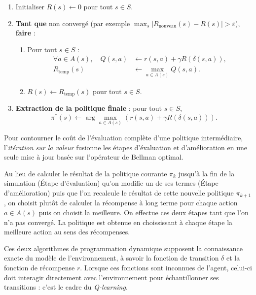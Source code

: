 \begin{algorithm}[H]
    \caption{Itération sur la valeur (\emph{Value Iteration})}
    \begin{enumerate}
        \item Initialiser $R(s) \longleftarrow 0$ pour tout $s \in S$.
        \item \textbf{Tant que} non convergé (par exemple $\max_{s} |R_{\text{nouveau}}(s) - R(s)| > \varepsilon$), \textbf{faire} :
        \begin{enumerate}
            \item Pour tout $s \in S$ :
            \begin{align}
                \forall a \in A(s), \quad Q(s, a) &\longleftarrow r(s, a) + \gamma R(\delta(s, a)), \\
                R_{\text{temp}}(s) &\longleftarrow \max_{a \in A(s)} Q(s, a).
            \end{align}
            \item $R(s) \longleftarrow R_{\text{temp}}(s)$ pour tout $s \in S$.
        \end{enumerate}
        \item \textbf{Extraction de la politique finale} : pour tout $s \in S$,
        \begin{equation}
            \pi^*(s) \longleftarrow \arg\max_{a \in A(s)} \left( r(s, a) + \gamma R(\delta(s, a)) \right).
        \end{equation}
    \end{enumerate}
\end{algorithm}

Pour contourner le coût de l'évaluation complète d'une politique intermédiaire, l'\emph{itération sur la valeur} fusionne les étapes d'évaluation et d'amélioration en une seule mise à jour basée sur l'opérateur de Bellman optimal. 

Au lieu de calculer le résultat de la politique courante $ \pi_k$ jusqu'à la fin de la simulation (Étape d'évaluation) qu'on modifie un de ses termes (Étape d'amélioration) puis que l'on recalcule le résultat de cette nouvelle politique $ \pi_{k+1}$, on choisit plutôt de calculer la récompense à long terme pour chaque action $a \in A(s)$ puis on choisit la meilleure. On effectue ces deux étapes tant que l'on n'a pas convergé. La politique est obtenue en choississant à chaque étape la meilleure action au sens des récompenses. 

\begin{remark}[Q-learning]
    Ces deux algorithmes de programmation dynamique supposent la connaissance exacte du modèle de l'environnement, à savoir la fonction de transition $\delta$ et la fonction de récompense $r$. Lorsque ces fonctions sont inconnues de l'agent, celui-ci doit interagir directement avec l'environnement pour échantillonner ses transitions : c'est le cadre du \emph{Q-learning}.
\end{remark}


